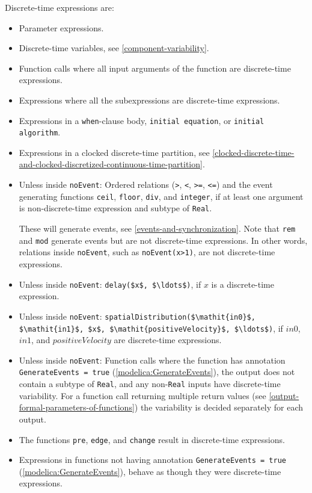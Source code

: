 Discrete-time expressions are:
\begin{itemize}
\item
  Parameter expressions.
\item
  Discrete-time variables, see \cref{component-variability}.
\item
  Function calls where all input arguments of the function are discrete-time expressions.
\item
  Expressions where all the subexpressions are discrete-time expressions.
\item
  Expressions in a \lstinline!when!-clause body, \lstinline!initial equation!, or \lstinline!initial algorithm!.
\item
  Expressions in a clocked discrete-time partition, see \cref{clocked-discrete-time-and-clocked-discretized-continuous-time-partition}.
\item
  Unless inside \lstinline!noEvent!: Ordered relations (\lstinline!>!, \lstinline!<!, \lstinline!>=!, \lstinline!<=!) and the event generating functions \lstinline!ceil!, \lstinline!floor!, \lstinline!div!, and \lstinline!integer!, if at least one argument is non-discrete-time expression and subtype of \lstinline!Real!.
  \begin{nonnormative}
  These will generate events, see \cref{events-and-synchronization}.
  Note that \lstinline!rem! and \lstinline!mod! generate events but are not discrete-time expressions.
  In other words, relations inside \lstinline!noEvent!, such as \lstinline!noEvent(x>1)!, are not discrete-time expressions.
  \end{nonnormative}
\item
  Unless inside \lstinline!noEvent!: \lstinline!delay($x$, $\ldots$)!, if $x$ is a discrete-time expression.
\item
  Unless inside \lstinline!noEvent!: \lstinline!spatialDistribution($\mathit{in0}$, $\mathit{in1}$, $x$, $\mathit{positiveVelocity}$, $\ldots$)!, if $\mathit{in0}$, $\mathit{in1}$, and $\mathit{positiveVelocity}$ are discrete-time expressions.
\item
  Unless inside \lstinline!noEvent!: Function calls where the function has annotation \lstinline!GenerateEvents = true! (\cref{modelica:GenerateEvents}), the output does not contain a subtype of \lstinline!Real!, and any non-\lstinline!Real! inputs have discrete-time variability.
  For a function call returning multiple return values (see \cref{output-formal-parameters-of-functions}) the variability is decided separately for each output.
\item
  The functions \lstinline!pre!, \lstinline!edge!, and \lstinline!change! result in discrete-time expressions.
\item
  Expressions in functions not having annotation \lstinline!GenerateEvents = true! (\cref{modelica:GenerateEvents}), behave as though they were discrete-time expressions.
\end{itemize}

